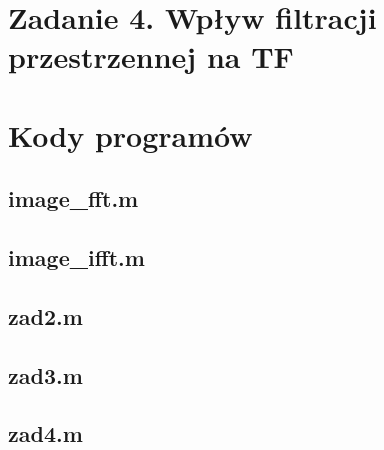





 


\section*{Zadanie 4. Wpływ filtracji przestrzennej na TF}







\newpage \section*{Kody programów}

\subsection*{image\_fft.m     }
\subsection*{image\_ifft.m    } \newpage
\subsection*{zad2.m           } \newpage
\subsection*{zad3.m           } \newpage
\subsection*{zad4.m           } \newpage









